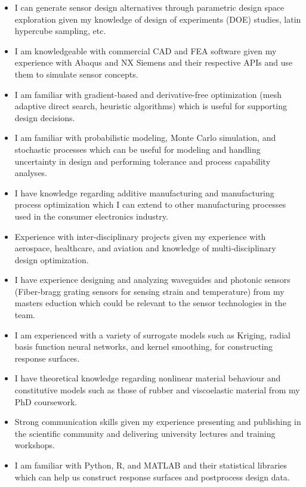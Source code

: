 \documentclass[12pt]{article} %
\begin{document}
\begin{itemize}
	\item I can generate sensor design alternatives through parametric design space exploration given my knowledge of design of experiments (DOE) studies, latin hypercube sampling, etc.
	\item I am knowledgeable with commercial CAD and FEA software given my experience with Abaqus and NX Siemens and their respective APIs and use them to simulate sensor concepts.
	\item I am familiar with gradient-based and derivative-free optimization (mesh adaptive direct search, heuristic algorithms) which is useful for supporting design decisions.
	\item I am familiar with probabilistic modeling, Monte Carlo simulation, and stochastic processes which can be useful for modeling and handling uncertainty in design and performing tolerance and process capability analyses.
	\item I have knowledge regarding additive manufacturing and manufacturing process optimization which I can extend to other manufacturing processes used in the consumer electronics industry.
	\item Experience with inter-disciplinary projects given my experience with aerospace, healthcare, and aviation and knowledge of multi-disciplinary design optimization.
	\item I have experience designing and analyzing waveguides and photonic sensors (Fiber-bragg grating sensors for sensing strain and temperature) from my masters eduction which could be relevant to the sensor technologies in the team.
	\item I am experienced with a variety of surrogate models such as Kriging, radial basis function neural networks, and kernel smoothing, for constructing response surfaces.
	\item I have theoretical knowledge regarding nonlinear material behaviour and constitutive models such as those of rubber and viscoelastic material from my PhD coursework.
	\item Strong communication skills given my experience presenting and publishing in the scientific community and delivering university lectures and training workshops.
	\item I am familiar with Python, R, and MATLAB and their statistical libraries which can help us construct response surfaces and postprocess design data.
\end{itemize}
\end{document}

